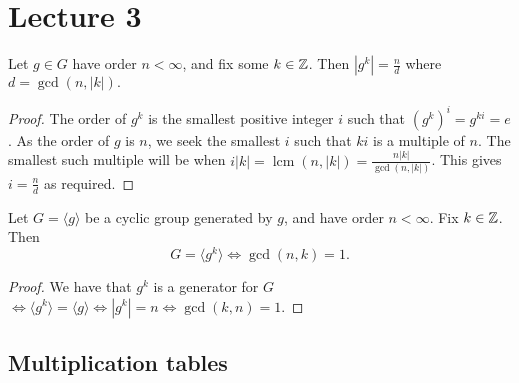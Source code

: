 \section{Lecture 3}

\begin{theorem}
  Let $g\in G$ have order $n<\infty$, and fix some $k\in\mathbb Z$. Then
  $|g^k|= \frac{n}{d}$ where $d=\gcd{(n,|k|)}.$
\end{theorem}

\begin{proof}
    The order of $g^k$ is the smallest positive integer $i$ such that $(g^k)^i = g^{ki} = e$. As the order of $g$ is $n$, we seek the smallest $i$ such that $ki$ is a multiple of $n$. The smallest such multiple will be when $i|k| = \operatorname{lcm}(n,|k|) = \frac{n|k|}{\gcd(n,|k|)}$.
    This gives $i = \frac{n}{d}$ as required.
    
\end{proof}

\begin{corollary}
  Let $G=\langle g \rangle$ be a cyclic group generated by $g$, and have order $n<\infty$. Fix
  $k\in\mathbb Z$. Then
  \[G=\langle g^k \rangle \iff \gcd{(n,k)}=1.\]
\end{corollary}
\begin{proof}
  We have that $g^k$ is a generator for $G$ $\iff \langle g^k \rangle = \langle g \rangle \iff |g^k|=n \iff
  \gcd{(k,n)}=1$.
\end{proof}


\subsection{Multiplication tables}

